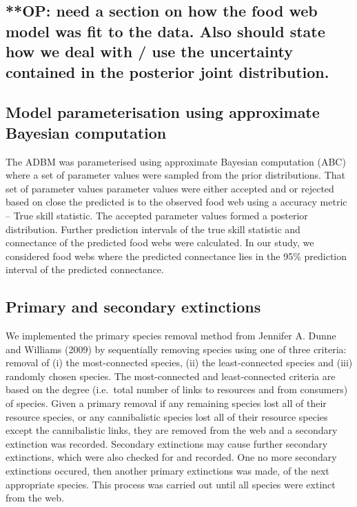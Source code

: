 \documentclass{article}
\begin{document}
\hypertarget{op-need-a-section-on-how-the-food-web-model-was-fit-to-the-data.-also-should-state-how-we-deal-with-use-the-uncertainty-contained-in-the-posterior-joint-distribution.}{%
\subsection{**OP: need a section on how the food web model was fit to
the data. Also should state how we deal with / use the uncertainty
contained in the posterior joint
distribution.}\label{op-need-a-section-on-how-the-food-web-model-was-fit-to-the-data.-also-should-state-how-we-deal-with-use-the-uncertainty-contained-in-the-posterior-joint-distribution.}}

\hypertarget{model-parameterisation-using-approximate-bayesian-computation}{%
\subsection{Model parameterisation using approximate Bayesian
computation}\label{model-parameterisation-using-approximate-bayesian-computation}}

The ADBM was parameterised using approximate Bayesian computation (ABC)
where a set of parameter values were sampled from the prior
distributions. That set of parameter values parameter values were either
accepted and or rejected based on close the predicted is to the observed
food web using a accuracy metric -- True skill statistic. The accepted
parameter values formed a posterior distribution. Further prediction
intervals of the true skill statistic and connectance of the predicted
food webs were calculated. In our study, we considered food webs where
the predicted connectance lies in the 95\% prediction interval of the
predicted connectance.

\hypertarget{primary-and-secondary-extinctions}{%
\subsection{Primary and secondary
extinctions}\label{primary-and-secondary-extinctions}}

We implemented the primary species removal method from Jennifer A. Dunne
and Williams (2009) by sequentially removing species using one of three
criteria: removal of (i) the most-connected species, (ii) the
least-connected species and (iii) randomly chosen species. The
most-connected and least-connected criteria are based on the degree
(i.e.~total number of links to resources and from consumers) of species.
Given a primary removal if any remaining species lost all of their
resource species, or any cannibalistic species lost all of their
resource species except the cannibalistic links, they are removed from
the web and a secondary extinction was recorded. Secondary extinctions
may cause further secondary extinctions, which were also checked for and
recorded. One no more secondary extinctions occured, then another
primary extinctions was made, of the next appropriate species. This
process was carried out until all species were extinct from the web.
\end{document}
